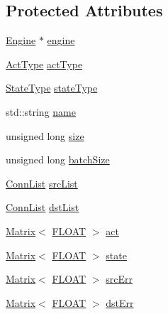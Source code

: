 \subsection*{Protected Attributes}
\begin{DoxyCompactItemize}
\item 
\hyperlink{classfractal_1_1Engine}{Engine} $\ast$ \hyperlink{classfractal_1_1Layer_a95f0129c9d79e1292d7d1e5732d70e5e}{engine}
\item 
\hyperlink{namespacefractal_a6b4f3887f3de57d4b1cbb00d198833ec}{Act\+Type} \hyperlink{classfractal_1_1Layer_a042deda27b82d3ff498bb5f9c4bbf115}{act\+Type}
\item 
\hyperlink{namespacefractal_a17646dafc0f3fc262f238822cca09f2e}{State\+Type} \hyperlink{classfractal_1_1Layer_a4f837fc5c1e649317ef534083ea24dfe}{state\+Type}
\item 
std\+::string \hyperlink{classfractal_1_1Layer_a657c8772dd166aca9aafc082850c1c78}{name}
\item 
unsigned long \hyperlink{classfractal_1_1Layer_ad772ed1139baedba2bb70b7f235f32d5}{size}
\item 
unsigned long \hyperlink{classfractal_1_1Layer_ab1bc36200fdb731ad1142d1dc96a6031}{batch\+Size}
\item 
\hyperlink{classfractal_1_1Layer_a112ea548588704c0915a32aa3269b5a6}{Conn\+List} \hyperlink{classfractal_1_1Layer_a9f497e9df823d1c65558e24a7ea2993e}{src\+List}
\item 
\hyperlink{classfractal_1_1Layer_a112ea548588704c0915a32aa3269b5a6}{Conn\+List} \hyperlink{classfractal_1_1Layer_ac0625856995bf53809a52fc1266bf706}{dst\+List}
\item 
\hyperlink{classfractal_1_1Matrix}{Matrix}$<$ \hyperlink{namespacefractal_a1c2d2530689575d5ccb56bae52af70d3}{F\+L\+O\+A\+T} $>$ \hyperlink{classfractal_1_1Layer_ab25f2b99a417bff762f544adf1efb08c}{act}
\item 
\hyperlink{classfractal_1_1Matrix}{Matrix}$<$ \hyperlink{namespacefractal_a1c2d2530689575d5ccb56bae52af70d3}{F\+L\+O\+A\+T} $>$ \hyperlink{classfractal_1_1Layer_a1d9a52b5c715cd8d769f36ed9136e1d3}{state}
\item 
\hyperlink{classfractal_1_1Matrix}{Matrix}$<$ \hyperlink{namespacefractal_a1c2d2530689575d5ccb56bae52af70d3}{F\+L\+O\+A\+T} $>$ \hyperlink{classfractal_1_1Layer_a1b0dd6aba3bd642fd8d60914d070779d}{src\+Err}
\item 
\hyperlink{classfractal_1_1Matrix}{Matrix}$<$ \hyperlink{namespacefractal_a1c2d2530689575d5ccb56bae52af70d3}{F\+L\+O\+A\+T} $>$ \hyperlink{classfractal_1_1Layer_a299f9cb54bb1bc123a78e2fe6486b6c2}{dst\+Err}

\end{DoxyCompactItemize}
